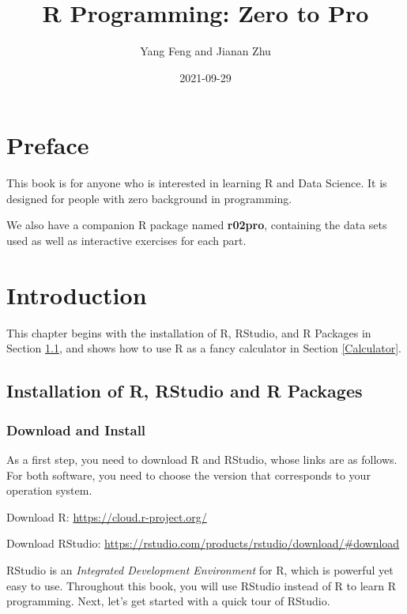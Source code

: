 \documentclass[
]{book}
\title{R Programming: Zero to Pro}
\author{Yang Feng and Jianan Zhu}
\date{2021-09-29}
\begin{document}
\maketitle

{
\hypersetup{linkcolor=}
\setcounter{tocdepth}{1}
\tableofcontents
}
\hypertarget{preface}{%
\chapter*{Preface}\label{preface}}

This book is for anyone who is interested in learning R and Data Science. It is designed for people with zero background in programming.

We also have a companion R package named \textbf{r02pro}, containing the data sets used as well as interactive exercises for each part.

\hypertarget{introduction}{%
\chapter{Introduction}\label{introduction}}

This chapter begins with the installation of R, RStudio, and R Packages in Section \ref{Installation}, and shows how to use R as a fancy calculator in Section \ref{Calculator}.

\hypertarget{Installation}{%
\section{Installation of R, RStudio and R Packages}\label{Installation}}

\hypertarget{download-and-install}{%
\subsection{Download and Install}\label{download-and-install}}

As a first step, you need to download R and RStudio, whose links are as follows. For both software, you need to choose the version that corresponds to your operation system.

Download R: \url{https://cloud.r-project.org/}

Download RStudio: \url{https://rstudio.com/products/rstudio/download/\#download}

RStudio is an \emph{Integrated Development Environment} for R, which is powerful yet easy to use. Throughout this book, you will use RStudio instead of R to learn R programming. Next, let's get started with a quick tour of RStudio.
\end{document}
